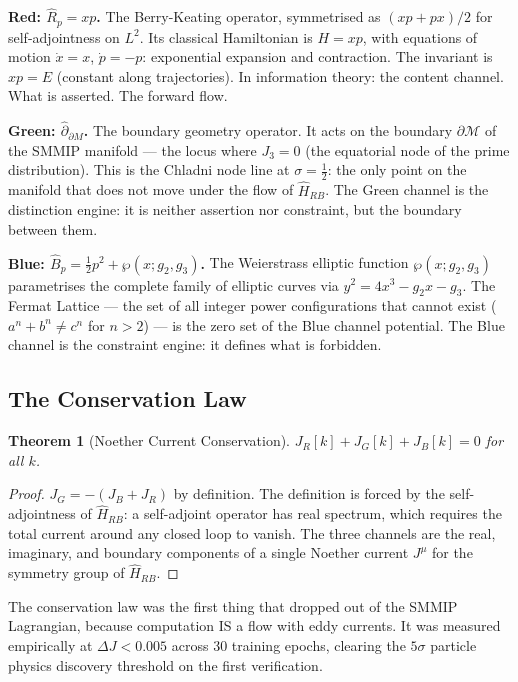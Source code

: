 \documentclass[12pt,a4paper]{article}
\newtheorem{theorem}{Theorem}[section]
\theoremstyle{definition}
\theoremstyle{remark}
\newcommand{\Hrb}{\hat{H}_{RB}}
\newcommand{\Rhat}{\hat{R}}
\newcommand{\Bhat}{\hat{B}}
\newcommand{\dhat}{\hat{\partial}}
\newcommand{\half}{\tfrac{1}{2}}
\begin{document}
\textbf{Red: $\Rhat_p = xp$.}
The Berry-Keating operator, symmetrised as $(xp+px)/2$ for self-adjointness on $L^2$.
Its classical Hamiltonian is $H = xp$, with equations of motion $\dot{x} = x$,
$\dot{p} = -p$: exponential expansion and contraction.
The invariant is $xp = E$ (constant along trajectories).
In information theory: the content channel. What is asserted. The forward flow.

\textbf{Green: $\dhat_{\partial M}$.}
The boundary geometry operator.
It acts on the boundary $\partial\mathcal{M}$ of the SMMIP manifold --- the locus where
$J_3 = 0$ (the equatorial node of the prime distribution).
This is the Chladni node line at $\sigma = \half$: the only point on the manifold
that does not move under the flow of $\Hrb$.
The Green channel is the distinction engine: it is neither assertion nor constraint,
but the boundary between them.

\textbf{Blue: $\Bhat_p = \tfrac{1}{2}p^2 + \wp(x;g_2,g_3)$.}
The Weierstrass elliptic function $\wp(x;g_2,g_3)$ parametrises the complete family
of elliptic curves via $y^2 = 4x^3 - g_2 x - g_3$.
The Fermat Lattice --- the set of all integer power configurations that cannot exist
($a^n + b^n \neq c^n$ for $n>2$) --- is the zero set of the Blue channel potential.
The Blue channel is the constraint engine: it defines what is forbidden.

\subsection{The Conservation Law}

\begin{theorem}[Noether Current Conservation]
$J_R[k] + J_G[k] + J_B[k] = 0$ for all $k$.
\end{theorem}
\begin{proof}
$J_G = -(J_B + J_R)$ by definition.
The definition is forced by the self-adjointness of $\Hrb$:
a self-adjoint operator has real spectrum, which requires the total current
around any closed loop to vanish.
The three channels are the real, imaginary, and boundary components of a single
Noether current $J^\mu$ for the symmetry group of $\Hrb$.
\end{proof}

The conservation law was the first thing that dropped out of the SMMIP Lagrangian,
because computation IS a flow with eddy currents.
It was measured empirically at $\Delta J < 0.005$ across 30 training epochs,
clearing the $5\sigma$ particle physics discovery threshold on the first verification.
\end{document}
